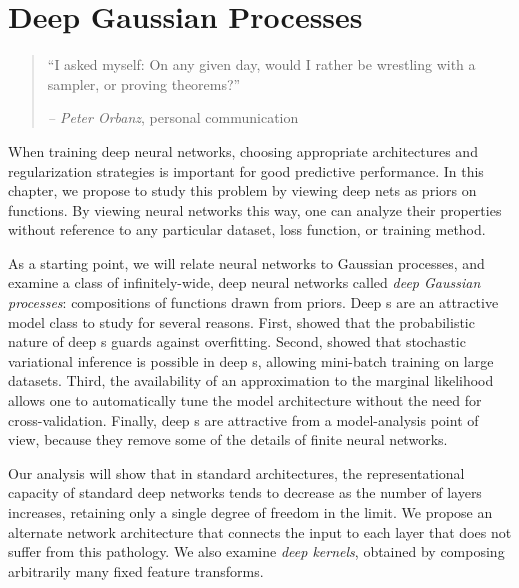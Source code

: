 
\inbpdocument


\chapter{Deep Gaussian Processes}
\label{ch:deep-limits}

\begin{quotation}
``I asked myself: On any given day, would I rather be wrestling with a sampler, or proving theorems?''

\hspace*{\fill} \emph{ -- Peter Orbanz}, personal communication
\end{quotation}


When training deep neural networks, choosing appropriate architectures and regularization strategies is important for good predictive performance.
In this chapter, we propose to study this problem by viewing deep nets as priors on functions.
By viewing neural networks this way, one can analyze their properties without reference to any particular dataset, loss function, or training method.

As a starting point, we will relate neural networks to Gaussian processes, and examine a class of infinitely-wide, deep neural networks called \emph{deep Gaussian processes}: compositions of functions drawn from \gp{} priors.
Deep \gp{}s are an attractive model class to study for several reasons.
First, \citet{damianou2012deep} showed that the probabilistic nature of deep \gp{}s guards against overfitting.
Second, \citet{hensman2014deep} showed that stochastic variational inference is possible in deep \gp{}s, allowing mini-batch training on large datasets.
Third, the availability of an approximation to the marginal likelihood allows one to automatically tune the model architecture without the need for cross-validation.
Finally, deep \gp{}s are attractive from a model-analysis point of view, because they remove some of the details of finite neural networks. %

Our analysis will show that in standard architectures, the representational capacity of standard deep networks tends to decrease as the number of layers increases, retaining only a single degree of freedom in the limit.
We propose an alternate network architecture that connects the input to each layer that does not suffer from this pathology.
We also examine \emph{deep kernels}, obtained by composing arbitrarily many fixed feature transforms.

